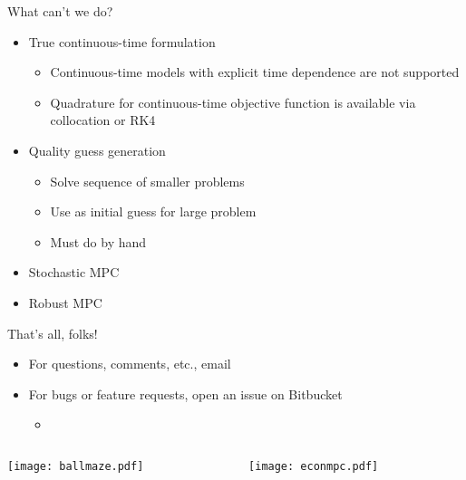 \documentclass[xcolor=dvipsnames,handout]{beamer}
\begin{document}
\begin{frame}{What can't we do?}
    \begin{itemize}
        \item True continuous-time formulation
        \begin{itemize}
            \item Continuous-time models with explicit time dependence are not supported
            \item Quadrature for continuous-time objective function is available via collocation or RK4
        \end{itemize} \pause
        \item Quality guess generation
        \begin{itemize}
            \item Solve sequence of smaller problems
            \item Use as initial guess for large problem
            \item Must do by hand
        \end{itemize} \pause
        \item Stochastic MPC \pause
        \item Robust MPC
    \end{itemize}
\end{frame}

\begin{frame}{That's all, folks!}
    \begin{itemize}
        \item For questions, comments, etc., email 
        \item For bugs or feature requests, open an issue on Bitbucket
        \begin{itemize}
            \item \bitbucketlink
        \end{itemize}
    \end{itemize}
    
    \bigskip
    
    \begin{columns}
        \begin{column}{0.475\textwidth}
            \texttt{[image: ballmaze.pdf]}
        \end{column}
        \begin{column}{0.475\textwidth}
            \texttt{[image: econmpc.pdf]}
        \end{column}
    \end{columns}
\end{frame}
\end{document}

